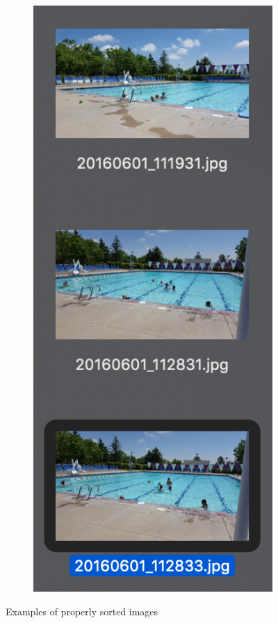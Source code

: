 \documentclass[12pt]{article}
\begin{document}
\begin{figure}[H]
\begin{subfigure}[b]{.33\textwidth}
	\end{subfigure}%
	~
	\begin{subfigure}[b]{.33\textwidth}
		\includegraphics[width=.75\textwidth]{images/correct_match_4.png}
	\end{subfigure}

	\caption{Examples of properly sorted images}
	\label{fig:correct_sort}
\end{figure}
\end{document}
